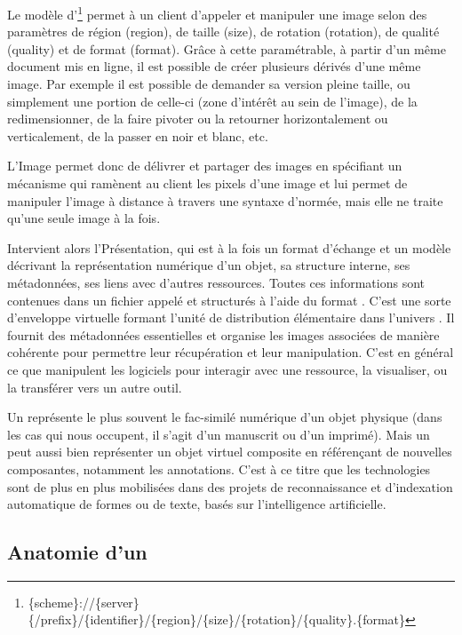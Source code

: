 Le modèle d'\URL\footnote{\{scheme\}://\{server\}\{/prefix\}/\{identifier\}/\{region\}/\{size\}/\{rotation\}/\{quality\}.\{format\}}
permet à un client d'appeler et manipuler une image selon des paramètres
de région (region), de taille (size), de rotation (rotation), de qualité
(quality) et de format (format). Grâce à cette \URL paramétrable, à partir
d'un même document mis en ligne, il est possible de créer plusieurs
dérivés d'une même image. Par exemple il est possible de demander sa
version pleine taille, ou simplement une portion de celle-ci
(zone d'intérêt au sein de l'image), de la redimensionner, de la faire
pivoter ou la retourner horizontalement ou verticalement, de la passer
en noir et blanc, etc.

L'\api Image permet donc de délivrer et partager des images en spécifiant
un mécanisme qui ramènent au client les pixels d'une image et lui permet
de manipuler l'image à distance à travers une syntaxe d'\URL normée, mais
elle ne traite qu'une seule image à la fois.

Intervient alors l'\api Présentation, qui est à la fois un format
d'échange et un modèle décrivant la représentation numérique d'un objet,
sa structure interne, ses métadonnées, ses liens avec d'autres
ressources. Toutes ces informations sont contenues dans un fichier
appelé \man et structurés à l'aide du format \json. C'est une
sorte d'enveloppe virtuelle formant l'unité de distribution élémentaire
dans l'univers \iiif. Il fournit des métadonnées essentielles et organise
les images associées de manière cohérente pour permettre leur
récupération et leur manipulation. C'est en général ce que manipulent
les logiciels pour interagir avec une ressource, la visualiser, ou la
transférer vers un autre outil.

Un \man \iiif représente le plus souvent le fac-similé
numérique d'un objet physique (dans les cas qui nous occupent, il s'agit
d'un manuscrit ou d'un imprimé). Mais un \man peut aussi bien
représenter un objet virtuel composite en référençant de nouvelles
composantes, notamment les annotations. C'est à ce titre que les
technologies \iiif sont de plus en plus mobilisées dans des projets de
reconnaissance et d'indexation automatique de formes ou de texte, basés
sur l'intelligence artificielle.

\hypertarget{anatomie-dun-manifest}{%
\subsection{Anatomie d'un
\man}\label{anatomie-dun-manifest}}

